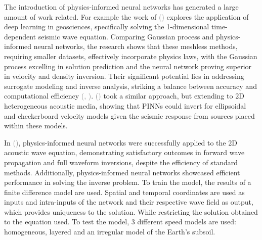 \documentclass{tufte-handout}
\renewcommand{\citep}[2][]{\textcolor{gray}{(\citeauthor{#2}, \citeyear[#1]{#2})}}
\renewcommand{\citeauthoryear}[2][]{\textcolor{gray}{\citeauthor{#2} (\textcolor{gray}{\citeyear[#1]{#2}})}}
\begin{document}
The introduction of physics-informed neural networks has generated a large amount of work related. For example the work of \citeauthoryear{karimpouli_physics_2020} explores the application of deep learning in geosciences, specifically solving the 1-dimensional time-dependent seismic wave equation. Comparing Gaussian process and physics-informed neural networks, the research shows that these meshless methods, requiring smaller datasets, effectively incorporate physics laws, with the Gaussian process excelling in solution prediction and the neural network proving superior in velocity and density inversion. Their significant potential lies in addressing surrogate modeling and inverse analysis, striking a balance between accuracy and computational efficiency \citep{Song2022}. \citeauthoryear{rash_2022} took a similar approach, but extending to 2D heterogeneous acoustic media, showing that PINNs could invert for ellipsoidal and checkerboard velocity models given the seismic response from sources placed within these models.



In \citeauthoryear{moseley_physics-informed_2022}, physics-informed neural networks were successfully applied to the 2D acoustic wave equation, demonstrating satisfactory outcomes in forward wave propagation and full waveform inversions, despite the efficiency of standard methods. Additionally, physics-informed neural networks showcased efficient performance in solving the inverse problem. To train the model, the results of a finite difference model are used. Spatial and temporal coordinates are used as inputs and intra-inputs of the network and their respective wave field as output, which provides uniqueness to the solution. While restricting the solution obtained to the equation used. To test the model, 3 different speed models are used: homogeneous, layered and an irregular model of the Earth's subsoil.


\end{document}

